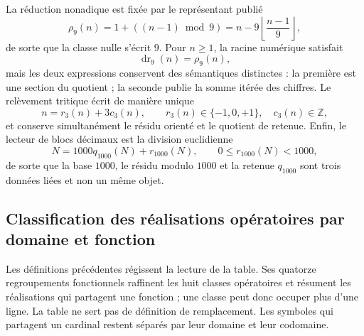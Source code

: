 La réduction nonadique est fixée par le représentant publié
\begin{equation}
 \rho_9(n)=1+((n-1)\bmod 9)
 =n-9\left\lfloor\frac{n-1}{9}\right\rfloor,
 \label{eq:rho9-construida-tpk-rev11}
\end{equation}
de sorte que la classe nulle s'écrit \(9\). Pour \(n\geq1\), la racine
numérique satisfait
\[
 \operatorname{dr}_9(n)=\rho_9(n),
\]
mais les deux expressions conservent des sémantiques distinctes : la première est une
section du quotient ; la seconde publie la somme itérée des chiffres. Le relèvement
tritique écrit de manière unique
\begin{equation}
 n=r_3(n)+3c_3(n),
 \qquad r_3(n)\in\{-1,0,+1\},\quad c_3(n)\in\mathbb Z,
 \label{eq:lift-mod3-tpk-rev11}
\end{equation}
et conserve simultanément le résidu orienté et le quotient de retenue.
Enfin, le lecteur de blocs décimaux est la division euclidienne
\begin{equation}
 N=1000q_{1000}(N)+r_{1000}(N),
 \qquad 0\leq r_{1000}(N)<1000,
 \label{eq:lector-mod1000-tpk-rev11}
\end{equation}
de sorte que la base \(1000\), le résidu modulo \(1000\) et la retenue \(q_{1000}\)
sont trois données liées et non un même objet.

\subsection{Classification des réalisations opératoires par domaine et fonction}

Les définitions précédentes régissent la lecture de la table. Ses quatorze
regroupements fonctionnels raffinent les huit classes opératoires et résument les
réalisations qui partagent une fonction ; une classe peut donc occuper plus
d'une ligne. La table ne sert pas de définition de remplacement. Les symboles qui
partagent un cardinal restent séparés par leur domaine et leur codomaine.

